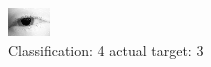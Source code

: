 \begin{figure}[h!]
\begin{center}
\includegraphics[width=0.60\columnwidth]{figures/ID162_class_4_target_3.png}
\end{center}
\caption{ Classification: 4 actual target: 3}
\label{fig:ID162_class_4_target_3}
\end{figure}
